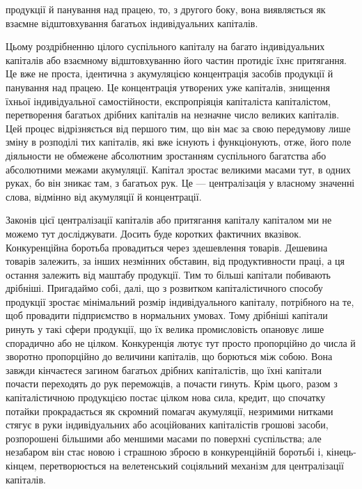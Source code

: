 \parcont{}  %
продукції й панування над працею, то, з другого боку, вона
виявляється як взаємне відштовхування багатьох індивідуальних
капіталів.

Цьому роздрібненню цілого суспільного капіталу на багато
індивідуальних капіталів або взаємному відштовхуванню його
частин протидіє їхнє притягання. Це вже не проста, ідентична
з акумуляцією концентрація засобів продукції й панування над
працею. Це концентрація утворених уже капіталів, знищення
їхньої індивідуальної самостійности, експропріяція капіталіста
капіталістом, перетворення багатьох дрібних капіталів на незначне
число великих капіталів. Цей процес відрізняється від
першого тим, що він має за свою передумову лише зміну в розподілі
тих капіталів, які вже існують і функціонують, отже, його
поле діяльности не обмежене абсолютним зростанням суспільного
багатства або абсолютними межами акумуляції. Капітал зростає
великими масами тут, в одних руках, бо він зникає там, з багатьох
рук. Це — централізація у власному значенні слова, відмінно
від акумуляції й концентрації.

Законів цієї централізації капіталів або притягання капіталу
капіталом ми не можемо тут досліджувати. Досить буде коротких
фактичних вказівок. Конкуренційна боротьба провадиться через
здешевлення товарів. Дешевина товарів залежить, за інших
незмінних обставин, від продуктивности праці, а ця остання
залежить від маштабу продукції. Тим то більші капітали побивають
дрібніші. Пригадаймо собі, далі, що з розвитком капіталістичного
способу продукції зростає мінімальний розмір індивідуального
капіталу, потрібного на те, щоб провадити підприємство
в нормальних умовах. Тому дрібніші капітали ринуть
у такі сфери продукції, що їх велика промисловість опановує лише
спорадично або не цілком. Конкуренція лютує тут просто пропорційно
до числа й зворотно пропорційно до величини капіталів,
що борються між собою. Вона завжди кінчаєтеся загином багатьох
дрібних капіталістів, що їхні капітали почасти переходять до
рук переможців, а почасти гинуть. Крім цього, разом з капіталістичною
продукцією постає цілком нова сила, кредит, що спочатку
потайки прокрадається як скромний помагач акумуляції,
незримими нитками стягує в руки індивідуальних або асоційованих
капіталістів грошові засоби, розпорошені більшими або
меншими масами по поверхні суспільства; але незабаром він стає
новою і страшною зброєю в конкуренційній боротьбі і, кінець-кінцем,
перетворюється на велетенський соціяльний механізм
для централізації капіталів.

